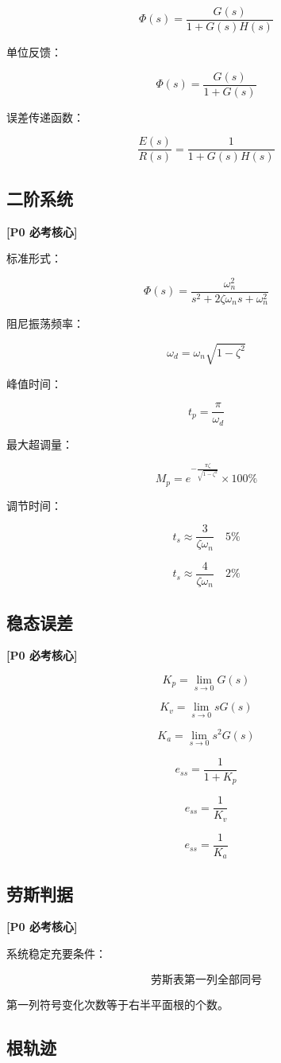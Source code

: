 \documentclass[UTF8,a4paper,12pt]{ctexart}
\newcommand{\Pzero}{\textcolor{p0}{\textbf{[P0 必考核心]}}}
\begin{document}
\[
\Phi(s)=\frac{G(s)}{1+G(s)H(s)}
\]

单位反馈：

\[
\Phi(s)=\frac{G(s)}{1+G(s)}
\]

误差传递函数：

\[
\frac{E(s)}{R(s)}=\frac{1}{1+G(s)H(s)}
\]

\subsection{二阶系统}

\Pzero

标准形式：

\[
\Phi(s)=\frac{\omega_n^2}{s^2+2\zeta\omega_ns+\omega_n^2}
\]

阻尼振荡频率：

\[
\omega_d=\omega_n\sqrt{1-\zeta^2}
\]

峰值时间：

\[
t_p=\frac{\pi}{\omega_d}
\]

最大超调量：

\[
M_p=e^{-\frac{\pi\zeta}{\sqrt{1-\zeta^2}}}\times100\%
\]

调节时间：

\[
t_s\approx\frac{3}{\zeta\omega_n}\quad 5\%
\]

\[
t_s\approx\frac{4}{\zeta\omega_n}\quad 2\%
\]

\subsection{稳态误差}

\Pzero

\[
K_p=\lim_{s\to0}G(s)
\]

\[
K_v=\lim_{s\to0}sG(s)
\]

\[
K_a=\lim_{s\to0}s^2G(s)
\]

\[
e_{ss}=\frac{1}{1+K_p}
\]

\[
e_{ss}=\frac{1}{K_v}
\]

\[
e_{ss}=\frac{1}{K_a}
\]

\subsection{劳斯判据}

\Pzero

系统稳定充要条件：

\[
\text{劳斯表第一列全部同号}
\]

第一列符号变化次数等于右半平面根的个数。

\subsection{根轨迹}
\end{document}
